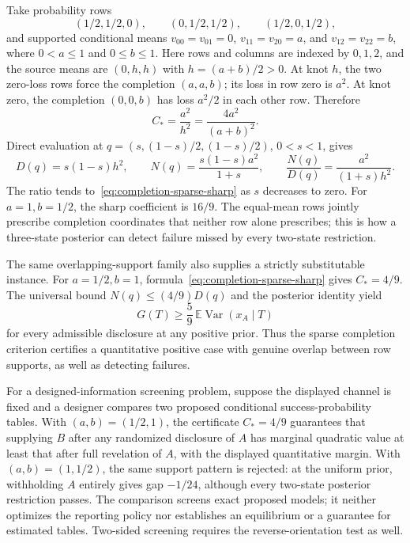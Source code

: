 \documentclass[11pt,a4paper]{article}
\newcommand{\E}{\mathbb E}
\newcommand{\Var}{\operatorname{Var}}
\begin{document}
Take probability rows
\[
 (1/2,1/2,0),\qquad(0,1/2,1/2),\qquad(1/2,0,1/2),
\]
and supported conditional means
$v_{00}=v_{01}=0$, $v_{11}=v_{20}=a$, and $v_{12}=v_{22}=b$,
where $0<a\leq1$ and $0\leq b\leq1$. Here rows and columns are indexed
by $0,1,2$, and the source means are $(0,h,h)$ with $h=(a+b)/2>0$.
At knot $h$, the two zero-loss rows force the completion $(a,a,b)$;
its loss in row zero is $a^2$. At knot zero, the completion $(0,0,b)$
has loss $a^2/2$ in each other row. Therefore
\begin{equation}\label{eq:completion-sparse-sharp}
 C_* =\frac{a^2}{h^2}=\frac{4a^2}{(a+b)^2}.
\end{equation}
Direct evaluation at $q=(s,(1-s)/2,(1-s)/2)$, $0<s<1$, gives
\[
 D(q)=s(1-s)h^2,\qquad
 N(q)=\frac{s(1-s)a^2}{1+s},\qquad
 \frac{N(q)}{D(q)}=\frac{a^2}{(1+s)h^2}.
\]
The ratio tends to~\eqref{eq:completion-sparse-sharp} as $s$ decreases
to zero. For $a=1,b=1/2$, the sharp coefficient is $16/9$.
The equal-mean rows jointly prescribe completion coordinates that
neither row alone prescribes; this is how a three-state posterior can
detect failure missed by every two-state restriction.

The same overlapping-support family also supplies a strictly substitutable
instance. For $a=1/2,b=1$, formula~\eqref{eq:completion-sparse-sharp}
gives $C_*=4/9$. The universal bound $N(q)\leq(4/9)D(q)$ and the
posterior identity yield
\[
 G(T)\geq\frac59\,\E\Var(x_A\mid T)
\]
for every admissible disclosure at any positive prior. Thus the sparse
completion criterion certifies a quantitative positive case with genuine
overlap between row supports, as well as detecting failures.

For a designed-information screening problem, suppose the displayed channel is fixed and a designer compares two proposed conditional success-probability tables. With $(a,b)=(1/2,1)$, the certificate $C_*=4/9$ guarantees that supplying $B$ after any randomized disclosure of $A$ has marginal quadratic value at least that after full revelation of $A$, with the displayed quantitative margin. With $(a,b)=(1,1/2)$, the same support pattern is rejected: at the uniform prior, withholding $A$ entirely gives gap $-1/24$, although every two-state posterior restriction passes. The comparison screens exact proposed models; it neither optimizes the reporting policy nor establishes an equilibrium or a guarantee for estimated tables. Two-sided screening requires the reverse-orientation test as well.
\end{document}
